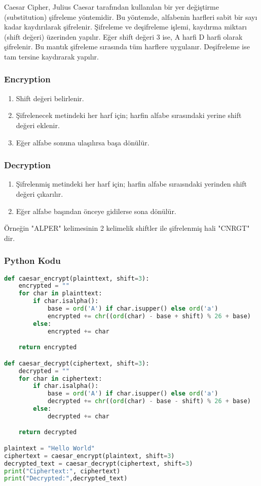 Caesar Cipher, Julius Caesar tarafından kullanılan bir yer değiştirme (substitution) şifreleme yöntemidir. Bu yöntemde, alfabenin harfleri sabit bir sayı kadar kaydırılarak şifrelenir. Şifreleme ve deşifreleme işlemi, kaydırma miktarı (shift değeri) üzerinden yapılır. Eğer shift değeri 3 ise, A harfi D harfi olarak şifrelenir. Bu mantık şifreleme sırasında tüm harflere uygulanır. Deşifreleme ise tam tersine kaydırarak yapılır.

\subsubsection{Encryption}

\begin{enumerate}
    \item Shift değeri belirlenir.
    \item Şifrelenecek metindeki her harf için; harfin alfabe sırasındaki yerine shift değeri eklenir.
    \item Eğer alfabe sonuna ulaşılırsa başa dönülür.
\end{enumerate}

\subsubsection{Decryption}

\begin{enumerate}
    \item Şifrelenmiş metindeki her harf için; harfin alfabe sıraısndaki yerinden shift değeri çıkarılır.
    \item Eğer alfabe başından önceye gidilerse sona dönülür.
\end{enumerate}

Örneğin "ALPER" kelimesinin 2 kelimelik shiftler ile şifrelenmiş hali "CNRGT" dir.

\subsubsection{Python Kodu}

\begin{lstlisting}[language=Python]
def caesar_encrypt(plainttext, shift=3):
    encrypted = ""
    for char in plainttext:
        if char.isalpha():
            base = ord('A') if char.isupper() else ord('a')
            encrypted += chr((ord(char) - base + shift) % 26 + base)
        else:
            encrypted += char

    return encrypted

def caesar_decrypt(ciphertext, shift=3):
    decrypted = ""
    for char in ciphertext:
        if char.isalpha():
            base = ord('A') if char.isupper() else ord('a')
            decrypted += chr((ord(char) - base - shift) % 26 + base)
        else:
            decrypted += char

    return decrypted

plaintext = "Hello World"
ciphertext = caesar_encrypt(plaintext, shift=3)
decrypted_text = caesar_decrypt(ciphertext, shift=3)
print("Ciphertext:", ciphertext)
print("Decrypted:",decrypted_text)
\end{lstlisting}


